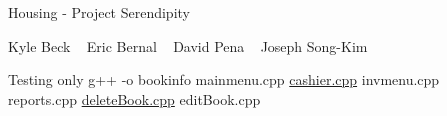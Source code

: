 Housing -\/ Project Serendipity

Kyle Beck ~\newline
 Eric Bernal ~\newline
 David Pena ~\newline
 Joseph Song-\/\+Kim ~\newline


Testing only g++ -\/o bookinfo mainmenu.\+cpp \mbox{\hyperlink{cashier_8cpp}{cashier.\+cpp}} invmenu.\+cpp reports.\+cpp \mbox{\hyperlink{deleteBook_8cpp}{delete\+Book.\+cpp}} edit\+Book.\+cpp 